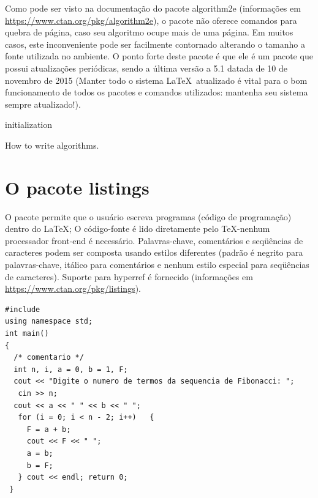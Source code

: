 Como pode ser visto na documentação do pacote \textsf{algorithm2e} (informações
em  \url{https://www.ctan.org/pkg/algorithm2e}), o pacote não oferece comandos 
para quebra de página, caso seu algoritmo ocupe mais de uma página. Em muitos
casos, este inconveniente pode ser facilmente contornado alterando o tamanho a
fonte utilizada no ambiente. O ponto forte deste pacote é que ele é um pacote 
que  possui atualizações periódicas, sendo a última versão a 5.1 datada de 10 
de novembro de 2015 (Manter todo o sistema \LaTeX\ atualizado é vital para o 
bom funcionamento de todos os pacotes e comandos utilizados: mantenha seu 
sistema sempre atualizado!).

\setcounter{algocf}{98}

\begin{algorithm}
\SetAlgoLined
{}
initialization\;
\caption{How to write algorithms.}
\end{algorithm}

\section{O pacote listings}

O pacote permite que o usuário escreva programas (código de programação) dentro
do \LaTeX; O código-fonte é lido diretamente pelo TeX-nenhum processador front-end
é necessário. Palavras-chave, comentários e seqüências de caracteres podem ser 
composta usando estilos diferentes (padrão é negrito para palavras-chave, itálico
para comentários e nenhum estilo especial para seqüências de caracteres). Suporte
para hyperref é fornecido (informações em \url{https://www.ctan.org/pkg/listings}).

\begin{lstlisting}[caption={Exemplo de código em C++ usando o pacote \texttt{listings} e que tem título longo ocupando mais de uma linha},label=ex-listing]
#include 
using namespace std;
int main()
{
  /* comentario */
  int n, i, a = 0, b = 1, F;
  cout << "Digite o numero de termos da sequencia de Fibonacci: ";
   cin >> n;
  cout << a << " " << b << " ";
   for (i = 0; i < n - 2; i++)   {
     F = a + b;
     cout << F << " ";
     a = b;
     b = F;
   } cout << endl; return 0;
 }
\end{lstlisting}


